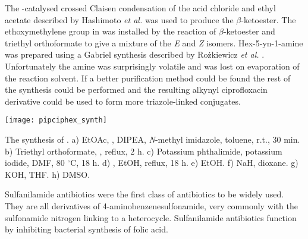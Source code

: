 The -catalysed crossed Claisen condensation of the acid chloride  and ethyl acetate described by Hashimoto \textit{et al.} \cite{Hashimoto2006} was used to produce the $\beta$-ketoester.
The ethoxymethylene group in  was installed by the reaction of $\beta$-ketoester  and triethyl orthoformate to give a mixture of the \textit{E} and \textit{Z} isomers\cite{Senthilkumar2009,Mitscher1986}.
Hex-5-yn-1-amine  was prepared using a Gabriel synthesis \cite{Gabriel1887} described by Rożkiewicz \textit{et al.} \cite{Rozkiewicz2006}. Unfortunately the amine was surprisingly volatile and was lost on evaporation of the reaction solvent. If a better purification method could be found the rest of the synthesis could be performed and the resulting alkynyl ciprofloxacin derivative  could be used to form more triazole-linked conjugates.

\begin{scheme}[H]
	\begin{center}
		\texttt{[image: pipciphex\_synth]}
		\caption{The synthesis of .
		a) EtOAc, , DIPEA, \textit{N}-methyl imidazole, toluene, r.t., 30 min.
		b) Triethyl orthoformate, , reflux, 2 h.
		c) Potassium phthalimide, potassium iodide, DMF, 80 $^{\circ}$C, 18 h.
		d) , EtOH, reflux, 18 h.
		e) EtOH.
		f) NaH, dioxane.
		g) KOH, THF.
		h) DMSO.
		\label{sch:pipciphex_synth}}
	\end{center}
\end{scheme}


Sulfanilamide antibiotics were the first class of antibiotics to be widely used\cite{Otten1986,Wainwright2011}. They are all derivatives of 4-aminobenzenesulfonamide, very commonly with the sulfonamide nitrogen linking to a heterocycle. Sulfanilamide antibiotics function by inhibiting bacterial synthesis of folic acid.

